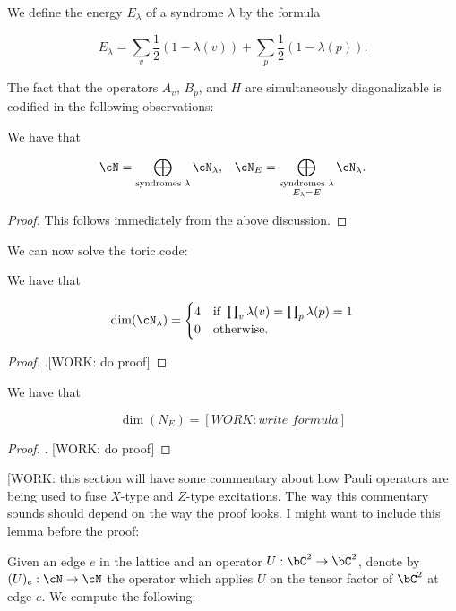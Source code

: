 We define the energy $E_{\lambda}$ of a syndrome $\lambda$ by the formula

$$E_{\lambda}=\sum_{v}\frac{1}{2}(1-\lambda(v))+\sum_{p}\frac{1}{2}(1-\lambda(p)).$$

The fact that the operators $A_v$, $B_p$, and $H$ are simultaneously diagonalizable is codified in the following observations:

\begin{prop} We have that

\begin{align*}
\cN = \bigoplus_{\text{syndromes $\lambda$}} \cN_{\lambda}, && \cN_{E}=\bigoplus_{\substack{\text{syndromes $\lambda$}  \\ E_\lambda = E }  } \cN_{\lambda}.
\end{align*}

\end{prop}
\begin{proof} This follows immediately from the above discussion.
\end{proof}


We can now solve the toric code:

\begin{prop} We have that

\begin{equation*}
\dim(\cN_{\lambda}) = 
\begin{cases}
4 & \text{if }\prod_{v}\lambda(v) = \prod_{p}\lambda(p) = 1\\
0 & \text{otherwise.}
\end{cases}
\end{equation*}

\end{prop}
\begin{proof}.[WORK: do proof]
\end{proof}

\begin{cor} We have that

$$\dim (N_{E})=[WORK: write\,\, formula]$$
\end{cor}
\begin{proof} . [WORK: do proof]
\end{proof}

[WORK: this section will have some commentary about how Pauli operators are being used to fuse $X$-type and $Z$-type excitations. The way this commentary sounds should depend on the way the proof looks. I might want to include this lemma before the proof:

Given an edge $e$ in the lattice and an operator $U:\bC^2\to \bC^2$, denote by $(U)_e:\cN\to\cN$ the operator which applies $U$ on the tensor factor of $\bC^2$ at edge $e$. We compute the following:

